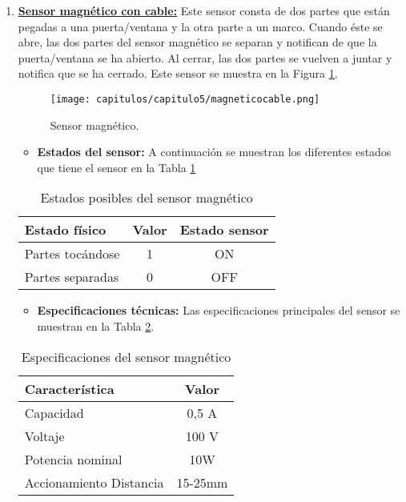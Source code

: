 \begin{enumerate}

\item \underline{\textbf{Sensor magnético con cable:}} Este sensor consta de dos partes que están pegadas a una puerta/ventana y la otra parte a un marco. Cuando éste se abre, las dos partes del sensor magnético se separan y notifican de que la puerta/ventana se ha abierto. Al cerrar, las dos partes se vuelven a juntar y notifica que se ha cerrado. Este sensor se muestra en la Figura \ref{fig:magnéticoc}.

\begin{figure}[h] 
    \centering
    \texttt{[image: capitulos/capitulo5/magneticocable.png]}
    \caption{Sensor magnético.}
    \label{fig:magnéticoc}
\end{figure}

\begin{itemize}
    \item \textbf{Estados del sensor:} A continuación se muestran los diferentes estados que tiene el sensor en la Tabla \ref{tab:magnéticoc}
\end{itemize}

\begin{table}[h]
    \centering
    \begin{tabular}{|l|c|c|}
        \rowcolor[gray]{.5}
        \hline
         \color{white}Estado físico&\color{white}Valor&\color{white}Estado sensor \\
         \hline
         Partes tocándose&1&ON \\
         \hline
         Partes separadas&0&OFF  \\
         \hline
    \end{tabular}
    \caption{Estados posibles del sensor magnético}
    \label{tab:magnéticoc}
\end{table}

\newpage
\begin{itemize}
    \item \textbf{Especificaciones técnicas:} Las especificaciones principales del sensor se muestran en la Tabla \ref{tab:magnéticoccesp}.
\end{itemize}

\begin{table}[h]
    \centering
    \begin{tabular}{|l|c|}
        \rowcolor[gray]{.5}
        \hline
            \color{white}Característica&\color{white}Valor  \\
        \hline
            Capacidad & 0,5 A  \\
        \hline    
            Voltaje & 100 V  \\
        \hline    
            Potencia nominal & 10W  \\
        \hline    
            Accionamiento Distancia & 15-25mm  \\
         \hline
    \end{tabular}
    \caption{Especificaciones del sensor magnético}
    \label{tab:magnéticoccesp}
\end{table}


\end{enumerate}
